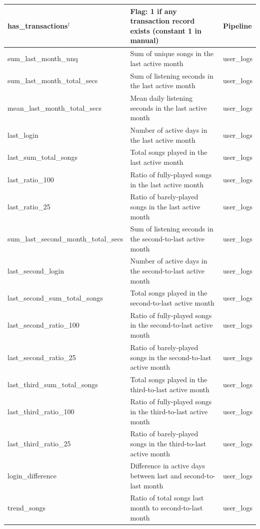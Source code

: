 \documentclass{article}
\begin{document}
\begin{longtable}{|l|p{7.5cm}|l|}
has\_transactions$^\dagger$ & Flag: 1 if any transaction record exists (\textbf{constant 1 in manual}) & Pipeline \\ \hline
sum\_last\_month\_unq & Sum of unique songs in the last active month & user\_logs \\ \hline
sum\_last\_month\_total\_secs & Sum of listening seconds in the last active month & user\_logs \\ \hline
mean\_last\_month\_total\_secs & Mean daily listening seconds in the last active month & user\_logs \\ \hline
last\_login & Number of active days in the last active month & user\_logs \\ \hline
last\_sum\_total\_songs & Total songs played in the last active month & user\_logs \\ \hline
last\_ratio\_100 & Ratio of fully-played songs in the last active month & user\_logs \\ \hline
last\_ratio\_25 & Ratio of barely-played songs in the last active month & user\_logs \\ \hline
sum\_last\_second\_month\_total\_secs & Sum of listening seconds in the second-to-last active month & user\_logs \\ \hline
last\_second\_login & Number of active days in the second-to-last active month & user\_logs \\ \hline
last\_second\_sum\_total\_songs & Total songs played in the second-to-last active month & user\_logs \\ \hline
last\_second\_ratio\_100 & Ratio of fully-played songs in the second-to-last active month & user\_logs \\ \hline
last\_second\_ratio\_25 & Ratio of barely-played songs in the second-to-last active month & user\_logs \\ \hline
last\_third\_sum\_total\_songs & Total songs played in the third-to-last active month & user\_logs \\ \hline
last\_third\_ratio\_100 & Ratio of fully-played songs in the third-to-last active month & user\_logs \\ \hline
last\_third\_ratio\_25 & Ratio of barely-played songs in the third-to-last active month & user\_logs \\ \hline
login\_difference & Difference in active days between last and second-to-last month & user\_logs \\ \hline
trend\_songs & Ratio of total songs last month to second-to-last month & user\_logs \\ \hline

\end{longtable}
\end{document}
